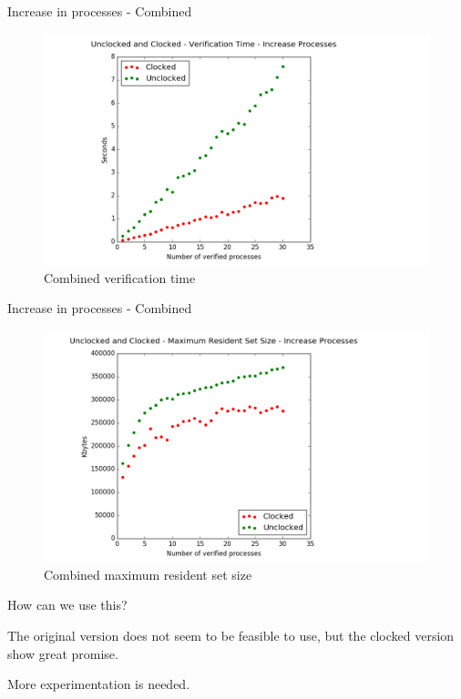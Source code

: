 \documentclass[11pt]{beamer}
\begin{document}
\begin{frame}{Increase in processes - Combined}
    \begin{figure}[!ht]
         \centering
         \includegraphics[scale=0.3]{figures/combined_verification_time_increase_proccess.png}
         \caption{Combined verification time}
    \end{figure}

\end{frame}


\begin{frame}{Increase in processes - Combined}
\begin{figure}[!ht]
     \centering
     \includegraphics[scale=0.3]{figures/combined_size_time_increase_proccess.png}
     \caption{Combined maximum resident set size}
\end{figure}
\end{frame}

%
\begin{frame}{How can we use this?}

\begin{block}{}
The original version does not seem to be feasible to use, but the clocked version show great promise.
\end{block}

\pause

\begin{block}{}
More experimentation is needed.
\end{block}

\end{frame}
\end{document}
